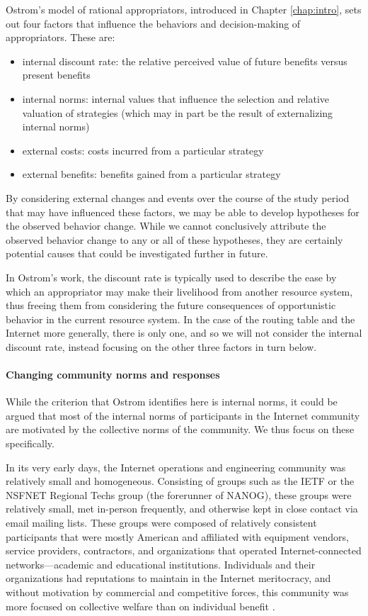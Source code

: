 Ostrom's model of rational appropriators, introduced in Chapter
\ref{chap:intro}, sets out four factors that influence the behaviors and
decision-making of appropriators. These are:
\begin{itemize}
    \item{internal discount rate: the relative perceived value of future
    benefits versus present benefits}
    \item{internal norms: internal values that influence the selection and
    relative valuation of strategies (which may in part be the result of
    externalizing internal norms)}
    \item{external costs: costs incurred from a particular strategy}
    \item{external benefits: benefits gained from a particular strategy}
\end{itemize}
By considering external changes and events over the course of the study period
that may have influenced these factors, we may be able to develop hypotheses
for the observed behavior change. While we cannot conclusively attribute the
observed behavior change to any or all of these hypotheses, they are certainly
potential causes that could be investigated further in future.

In Ostrom's work, the discount rate is typically used to describe the ease by
which an appropriator may make their livelihood from another resource system,
thus freeing them from considering the future consequences of opportunistic
behavior in the current resource system.  In the case of the routing table and
the Internet more generally, there is only one, and so we will not consider the
internal discount rate, instead focusing on the other three factors in turn
below.

\paragraph{Changing community norms and responses}
While the criterion that Ostrom identifies here is internal norms, it could be
argued that most of the internal norms of participants in the Internet
community are motivated by the collective norms of the community. We thus focus
on these specifically.

In its very early days, the Internet operations and engineering community was
relatively small and homogeneous. Consisting of groups such as the IETF or the
NSFNET Regional Techs group (the forerunner of NANOG), these groups were
relatively small, met in-person frequently, and otherwise kept in close contact
via email mailing lists. These groups were composed of relatively consistent
participants that were mostly American and affiliated with equipment vendors,
service providers, contractors, and organizations that operated
Internet-connected networks---academic and educational institutions.
Individuals and their organizations had reputations to maintain in the Internet
meritocracy, and without motivation by commercial and competitive forces, this
community was more focused on collective welfare than on individual benefit
\cite{Li:2011vn}.

